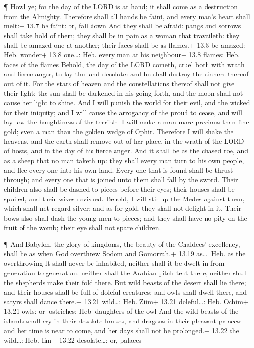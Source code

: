  ¶ Howl ye; for the day of the LORD is at hand; it shall
come as a destruction from the Almighty.  Therefore shall
all hands be faint, and every man's heart shall melt:+ 13.7 be faint:
or, fall down  And they shall be afraid: pangs and sorrows
shall take hold of them; they shall be in pain as a woman that
travaileth: they shall be amazed one at another; their faces shall be as
flames.+ 13.8 be amazed: Heb. wonder+ 13.8 one\ldots: Heb. every man at
his neighbour+ 13.8 flames: Heb. faces of the flames 
Behold, the day of the LORD cometh, cruel both with wrath and fierce
anger, to lay the land desolate: and he shall destroy the sinners
thereof out of it.  For the stars of heaven and the
constellations thereof shall not give their light: the sun shall be
darkened in his going forth, and the moon shall not cause her light to
shine.  And I will punish the world for their evil, and the
wicked for their iniquity; and I will cause the arrogancy of the proud
to cease, and will lay low the haughtiness of the terrible.
 I will make a man more precious than fine gold; even a man
than the golden wedge of Ophir.  Therefore I will shake the
heavens, and the earth shall remove out of her place, in the wrath of
the LORD of hosts, and in the day of his fierce anger.  And
it shall be as the chased roe, and as a sheep that no man taketh up:
they shall every man turn to his own people, and flee every one into his
own land.  Every one that is found shall be thrust through;
and every one that is joined unto them shall fall by the sword.
 Their children also shall be dashed to pieces before their
eyes; their houses shall be spoiled, and their wives ravished.
 Behold, I will stir up the Medes against them, which shall
not regard silver; and as for gold, they shall not delight in it.
 Their bows also shall dash the young men to pieces; and
they shall have no pity on the fruit of the womb; their eye shall not
spare children.

 ¶ And Babylon, the glory of kingdoms, the beauty of the
Chaldees' excellency, shall be as when God overthrew Sodom and
Gomorrah.+ 13.19 as\ldots: Heb. as the overthrowing  It
shall never be inhabited, neither shall it be dwelt in from generation
to generation: neither shall the Arabian pitch tent there; neither shall
the shepherds make their fold there.  But wild beasts of
the desert shall lie there; and their houses shall be full of doleful
creatures; and owls shall dwell there, and satyrs shall dance there.+
13.21 wild\ldots: Heb. Ziim+ 13.21 doleful\ldots: Heb. Ochim+ 13.21
owls: or, ostriches: Heb. daughters of the owl  And the
wild beasts of the islands shall cry in their desolate houses, and
dragons in their pleasant palaces: and her time is near to come, and her
days shall not be prolonged.+ 13.22 the wild\ldots: Heb. Iim+ 13.22
desolate\ldots: or, palaces

